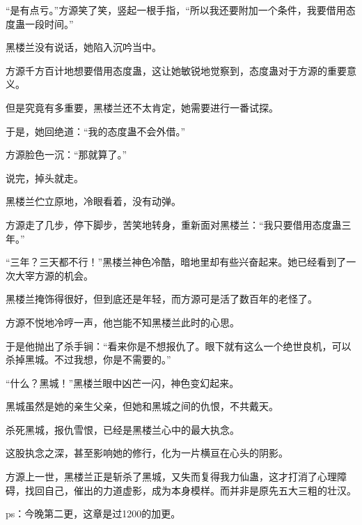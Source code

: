 \begin{this_body}
“是有点亏。”方源笑了笑，竖起一根手指，“所以我还要附加一个条件，我要借用态度蛊一段时间。”

黑楼兰没有说话，她陷入沉吟当中。

方源千方百计地想要借用态度蛊，这让她敏锐地觉察到，态度蛊对于方源的重要意义。

但是究竟有多重要，黑楼兰还不太肯定，她需要进行一番试探。

于是，她回绝道：“我的态度蛊不会外借。”

方源脸色一沉：“那就算了。”

说完，掉头就走。

黑楼兰伫立原地，冷眼看着，没有动弹。

方源走了几步，停下脚步，苦笑地转身，重新面对黑楼兰：“我只要借用态度蛊三年。”

“三年？三天都不行！”黑楼兰神色冷酷，暗地里却有些兴奋起来。她已经看到了一次大宰方源的机会。

黑楼兰掩饰得很好，但到底还是年轻，而方源可是活了数百年的老怪了。

方源不悦地冷哼一声，他岂能不知黑楼兰此时的心思。

于是他抛出了杀手锏：“看来你是不想报仇了。眼下就有这么一个绝世良机，可以杀掉黑城。不过我想，你是不需要的。”

“什么？黑城！”黑楼兰眼中凶芒一闪，神色变幻起来。

黑城虽然是她的亲生父亲，但她和黑城之间的仇恨，不共戴天。

杀死黑城，报仇雪恨，已经是黑楼兰心中的最大执念。

这股执念之深，甚至影响她的修行，化为一片横亘在心头的阴影。

方源上一世，黑楼兰正是斩杀了黑城，又失而复得我力仙蛊，这才打消了心理障碍，找回自己，催出的力道虚影，成为本身模样。而并非是原先五大三粗的壮汉。

ps：今晚第二更，这章是过1200的加更。

\end{this_body}

